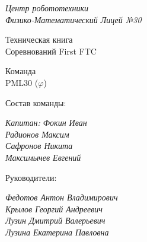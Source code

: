 	
\thispagestyle{titlestyle}
\begin{titlepage}
	\newpage
	
	\begin{center}
		\LARGE\textit{Центр робототехники \\ Физико-Математический Лицей №30}
		
		\vspace{8em}
		
		\LARGE{Техническая книга \\ Соревнований First FTC}
		
		\vspace{4em}
		
		Команда \\ PML30 (${\varphi}$)
		
	\end{center}
\end{titlepage}

\newpage
\large Состав команды:

\begin{flushleft}
	\emph{Капитан: Фокин Иван} \\
	\emph{Радионов Максим} \\
	\emph{Сафронов Никита} \\
	\emph{Максимычев Евгений}
\end{flushleft}

\large Руководители:

\begin{flushleft}
	\emph{Федотов Антон Владимирович} \\
	\emph{Крылов Георгий Андреевич} \\
	\emph{Лузин Дмитрий Валерьевич} \\
	\emph{Лузина Екатерина Павловна}
\end{flushleft} 
  
\newpage
